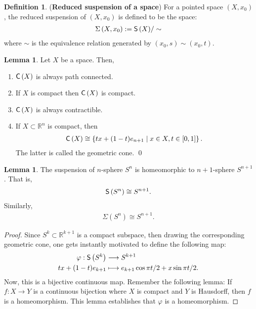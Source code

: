 \documentclass[letterpaper,11pt,twoside]{article}
\theoremstyle{definition}
\theoremstyle{definition}
\newtheorem{definition}[proposition]{Definition}
\theoremstyle{definition}
\theoremstyle{definition}
\newtheorem{lemma}[proposition]{\textbf{Lemma}}
\theoremstyle{definition}
\theoremstyle{definition}
\theoremstyle{remark}
\theoremstyle{definition}
\newcommand{\isom}{\cong}
\newcommand{\R}[0]{\mathbb{R}}
\newcommand{\cone}[1]{{\fontfamily{lmss}\selectfont 
		\text{C}\left(#1\right)
}}
\newcommand{\susp}[1]{{\fontfamily{lmss}\selectfont 
		\text{S}\left(#1\right)
}}
\newcommand{\rsusp}[1]{\Sigma\left(#1\right)}
\begin{document}
\begin{definition}
    (\textbf{Reduced suspension of a space}) For a pointed space $(X,x_0)$, the reduced suspension of $(X,x_0)$ is defined to be the space:
    \begin{align*}
        \rsusp{X,x_0} := \susp{X}/\sim
    \end{align*}
    where $\sim$ is the equivalence relation generated by $(x_0,s) \sim (x_0,t)$.    
\end{definition}
\begin{lemma}
    Let $X$ be a space. Then,
    \begin{enumerate}
        \item {$\cone{X}$ is always path connected.}
        \item{If $X$ is compact then $\cone{X}$ is compact.}
        \item {$\cone{X}$ is always contractible.}
        \item {If $X\subset \R^n$ is compact, then 
        \begin{align*}
            \cone{X} \isom \left\{ tx + (1-t)e_{n+1} \;\vert\; x\in X, t\in[0,1]\right\}.
        \end{align*}
        The latter is called the geometric cone. \qed
        }
    \end{enumerate}
\end{lemma}
\begin{lemma}\label{L-1.0.7}
    The suspension of $n$-sphere $S^n$ is homeomorphic to $n+1$-sphere $S^{n+1}$. That is,
    \begin{align*}
        \susp{S^n} \isom S^{n+1}.
    \end{align*}
    Similarly, 
    \begin{align*}
        \rsusp{S^n} \isom S^{n+1}.
    \end{align*}
\end{lemma}
	\begin{proof}
	Since $S^k \subset \R^{k+1}$ is a compact subspace, then drawing the corresponding geometric cone, one gets instantly motivated to define the following map:
	\begin{align*}
	    \varphi : \susp{S^k} &\longrightarrow S^{k+1}\\
                    tx + (1-t)e_{k+1} &\longmapsto e_{k+1}\cos{\pi t/2} + x\sin{\pi t/2}.
	\end{align*}
	Now, this is a bijective continuous map. Remember the following lemma: If $f : X\to Y$ is a continuous bijection where $X$ is compact and $Y$ is Hausdorff, then $f$ is a homeomorphism. This lemma establishes that $\varphi$ is a homeomorphism.
	\end{proof}
\end{document}
